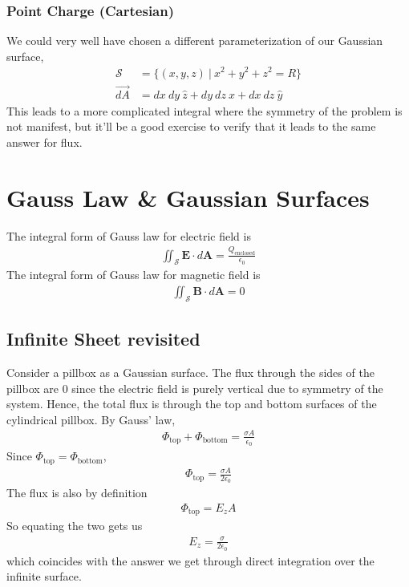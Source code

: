 \documentclass{article}
\begin{document}
\subsubsection{Point Charge (Cartesian)}
We could very well have chosen a different parameterization of our Gaussian surface,
\begin{align}
    \mathcal{S} &= \{ (x,y,z)\ \vert\ x^2 + y^2 + z^2 = R \}  \\
    \overrightarrow{dA} &= dx\ dy\ \hat{z} + dy\ dz\ \hat{x} + dx\ dz\ \hat{y}
\end{align}
This leads to a more complicated integral where the symmetry of the problem is not manifest, but it'll be a good exercise to verify that it leads to the same answer for flux.
\section{Gauss Law \& Gaussian Surfaces}
The integral form of Gauss law for electric field is 
\begin{align}
    \iint_\mathcal{S} \mathbf{E} \cdot d\mathbf{A} = \frac{Q_{\text{enclosed}}}{\epsilon_0}
\end{align}
The integral form of Gauss law for magnetic field is 
\begin{align}
    \iint_\mathcal{S} \mathbf{B} \cdot d\mathbf{A} = 0
\end{align}
\subsection{Infinite Sheet revisited}
Consider a pillbox as a Gaussian surface. The flux through the sides of the pillbox are $0$ since the electric field is purely vertical due to symmetry of the system. Hence, the total flux is through the top and bottom surfaces of the cylindrical pillbox. By Gauss' law, 
\begin{align}
    \Phi_{\text{top}} + \Phi_{\text{bottom}} = \frac{\sigma A}{\epsilon_0}
\end{align}
Since $\Phi_{\text{top}} = \Phi_{\text{bottom}}$, 
\begin{align}
    \Phi_{\text{top}} = \frac{\sigma A}{2\epsilon_0}
\end{align}
The flux is also by definition 
\begin{align}
    \Phi_{\text{top}} = E_{z} A 
\end{align}
So equating the two gets us
\begin{align}
    E_{z} = \frac{\sigma}{2\epsilon_0}
\end{align}
which coincides with the answer we get through direct integration over the infinite surface.
\end{document}

